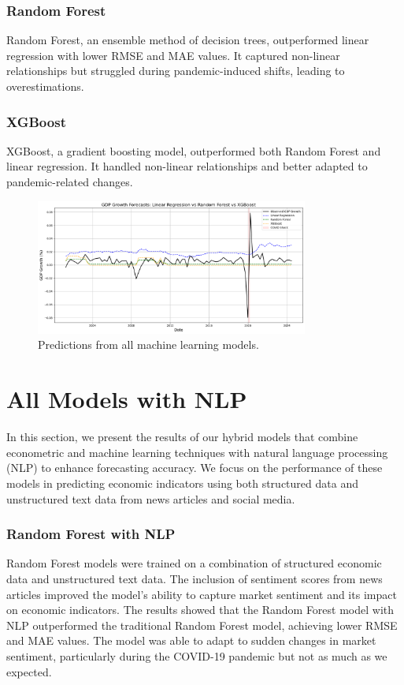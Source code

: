 \subsubsection{Random Forest}
\label{subsubsec:random_forest}

Random Forest, an ensemble method of decision trees, outperformed linear regression with lower RMSE and MAE values. It captured non-linear relationships but struggled during pandemic-induced shifts, leading to overestimations.

\subsubsection{XGBoost}
\label{subsubsec:xgboost}

XGBoost, a gradient boosting model, outperformed both Random Forest and linear regression. It handled non-linear relationships and better adapted to pandemic-related changes.

\begin{figure}[ht]
    \centering
    \includegraphics[width=0.8\textwidth]{../images/all-ml-models.png}
    \caption{Predictions from all machine learning models.}
    \label{fig:all-ml-models}
\end{figure}

\section{All Models with NLP}
\label{subsec:all_models_nlp}
In this section, we present the results of our hybrid models that combine econometric and machine learning techniques with natural language processing (NLP) to enhance forecasting accuracy. We focus on the performance of these models in predicting economic indicators using both structured data and unstructured text data from news articles and social media.

\subsubsection{Random Forest with NLP}
\label{subsubsec:random_forest_nlp}
Random Forest models were trained on a combination of structured economic data and unstructured text data. The inclusion of sentiment scores from news articles improved the model's ability to capture market sentiment and its impact on economic indicators.
The results showed that the Random Forest model with NLP outperformed the traditional Random Forest model, achieving lower RMSE and MAE values. The model was able to adapt to sudden changes in market sentiment, particularly during the COVID-19 pandemic but not as much as we expected.

